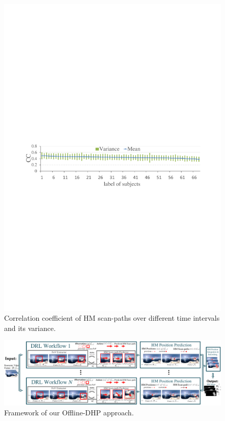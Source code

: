\documentclass[10pt,journal,compsoc]{IEEEtran}
\begin{document}
\begin{figure}
	\begin{center}
		\centerline{\includegraphics[width=1\columnwidth]{figures/database/consi_on_time}}%
		\caption{\footnotesize{Correlation coefficient of HM scan-paths over different time intervals and its variance. }}
		\label{consi_on_time}
	\end{center}
\end{figure}

\begin{figure}
	\begin{center}
		\centerline{\includegraphics[width=1.5\columnwidth]{figures/dhp_approach/main_framework}}%
		\caption{Framework of our Offline-DHP approach.}
		\label{main-framework}
	\end{center}
\end{figure}
\end{document}
